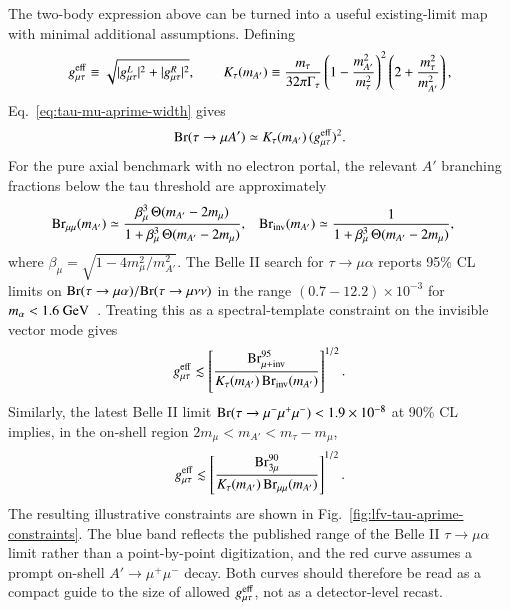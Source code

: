 \documentclass[onecolumn, aps, nofootinbib, prd, preprint, floats, floatfix, amsmath, amssymb, superscriptaddress, preprintnumbers]{revtex4-1}
\begin{document}
The two-body expression above can be turned into a useful existing-limit map with minimal additional assumptions. Defining
\begin{equation}
g_{\mu\tau}^{\rm eff}\equiv
\sqrt{|g_{\mu\tau}^{L}|^2+|g_{\mu\tau}^{R}|^2},
\qquad
K_\tau(m_{A'})\equiv
\frac{m_\tau}{32\pi\Gamma_\tau}
\left(1-\frac{m_{A'}^2}{m_\tau^2}\right)^2
\left(2+\frac{m_\tau^2}{m_{A'}^2}\right),
\label{eq:lfv-gtau-def}
\end{equation}
Eq.~\eqref{eq:tau-mu-aprime-width} gives
\begin{equation}
{\rm Br}(\tau\to\mu A')\simeq
K_\tau(m_{A'})\,(g_{\mu\tau}^{\rm eff})^2 .
\label{eq:lfv-two-body-branching}
\end{equation}
For the pure axial benchmark with no electron portal, the relevant \(A'\) branching fractions below the tau threshold are approximately
\begin{align}
{\rm Br}_{\mu\mu}(m_{A'})
&\simeq
\frac{\beta_\mu^3\,\Theta(m_{A'}-2m_\mu)}
{1+\beta_\mu^3\,\Theta(m_{A'}-2m_\mu)},&
{\rm Br}_{\rm inv}(m_{A'})
&\simeq
\frac{1}
{1+\beta_\mu^3\,\Theta(m_{A'}-2m_\mu)},
\label{eq:aprime-lfv-branching-fractions}
\end{align}
where \(\beta_\mu=\sqrt{1-4m_\mu^2/m_{A'}^2}\). The Belle II search for \(\tau\to\mu\alpha\) reports 95\% CL limits on \({\rm Br}(\tau\to\mu\alpha)/{\rm Br}(\tau\to\mu\nu\nu)\) in the range \((0.7-12.2)\times10^{-3}\) for \(m_\alpha<1.6~{\rm GeV}\)~\cite{Belle-II:2022heu}. Treating this as a spectral-template constraint on the invisible vector mode gives
\begin{equation}
g_{\mu\tau}^{\rm eff}
\lesssim
\left[
\frac{{\rm Br}^{95}_{\mu+{\rm inv}}}
{K_\tau(m_{A'})\,{\rm Br}_{\rm inv}(m_{A'})}
\right]^{1/2}.
\label{eq:lfv-invisible-limit}
\end{equation}
Similarly, the latest Belle II limit \({\rm Br}(\tau\to\mu^-\mu^+\mu^-)<1.9\times10^{-8}\) at 90\% CL~\cite{Belle-II:2024ami} implies, in the on-shell region \(2m_\mu<m_{A'}<m_\tau-m_\mu\),
\begin{equation}
g_{\mu\tau}^{\rm eff}
\lesssim
\left[
\frac{{\rm Br}^{90}_{3\mu}}
{K_\tau(m_{A'})\,{\rm Br}_{\mu\mu}(m_{A'})}
\right]^{1/2}.
\label{eq:lfv-3mu-limit}
\end{equation}
The resulting illustrative constraints are shown in Fig.~\ref{fig:lfv-tau-aprime-constraints}. The blue band reflects the published range of the Belle II \(\tau\to\mu\alpha\) limit rather than a point-by-point digitization, and the red curve assumes a prompt on-shell \(A'\to\mu^+\mu^-\) decay. Both curves should therefore be read as a compact guide to the size of allowed \(g_{\mu\tau}^{\rm eff}\), not as a detector-level recast.
\end{document}
